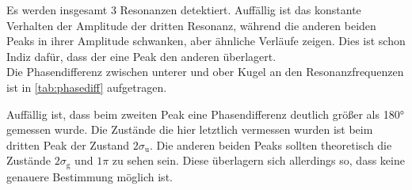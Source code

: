 Es werden insgesamt 3 Resonanzen detektiert. Auffällig ist das konstante Verhalten der Amplitude
der dritten Resonanz, während die anderen beiden Peaks in ihrer Amplitude schwanken, aber ähnliche
Verläufe zeigen. Dies ist schon Indiz dafür, dass der eine Peak den anderen überlagert. \\
Die Phasendifferenz zwischen unterer und ober Kugel an den Resonanzfrequenzen ist in \autoref{tab:phasediff}
aufgetragen.

Auffällig ist, dass beim zweiten Peak eine Phasendifferenz deutlich größer als 180$°$ gemessen wurde.
Die Zustände die hier letztlich vermessen wurden ist beim dritten Peak der Zustand $ 2 \sigma_{\text{u}}$.
Die anderen beiden Peaks sollten theoretisch die Zustände $2 \sigma_{\text{g}}$ und 
$1 \pi$ zu sehen sein. Diese überlagern sich allerdings so, dass keine genauere Bestimmung möglich ist.

